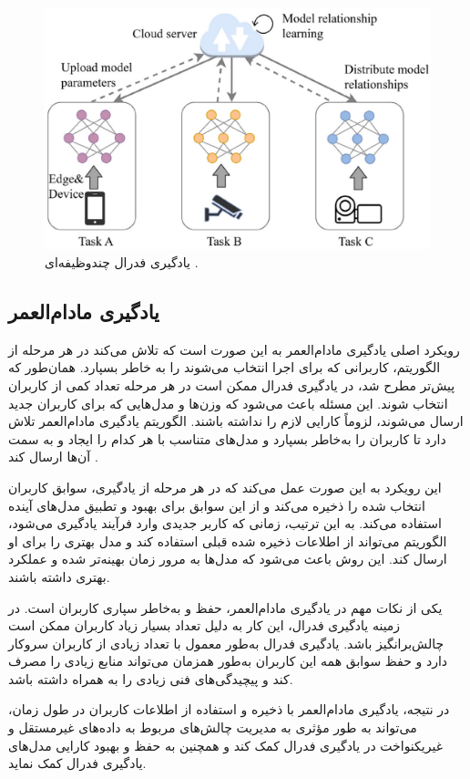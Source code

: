 \begin{figure}[b!]
	\centering
	\includegraphics[scale=0.9]{images/chap3/multi_tasking.png}%
	\caption{%
		یادگیری فدرال چندوظیفه‌ای
		\cite{ma2022state}%
		.
	}
	\label{multi_tasking}
	\centering
\end{figure}


\subsection{
	یادگیری مادام‌العمر%
}
رویکرد اصلی یادگیری مادام‌العمر به این صورت است که تلاش می‌کند در هر مرحله از الگوریتم، کاربرانی که برای اجرا انتخاب می‌شوند را به خاطر بسپارد. همان‌طور که پیش‌تر مطرح شد، در یادگیری فدرال ممکن است در هر مرحله تعداد کمی از کاربران انتخاب شوند. این مسئله باعث می‌شود که وزن‌ها و مدل‌هایی که برای کاربران جدید ارسال می‌شوند، لزوماً کارایی لازم را نداشته باشند. الگوریتم یادگیری مادام‌العمر تلاش دارد تا کاربران را به‌خاطر بسپارد و مدل‌های متناسب با هر کدام را ایجاد و به سمت آن‌ها ارسال کند
\cite{shoham2019overcoming}.

این رویکرد به این صورت عمل می‌کند که در هر مرحله از یادگیری، سوابق کاربران انتخاب شده را ذخیره می‌کند و از این سوابق برای بهبود و تطبیق مدل‌های آینده استفاده می‌کند. به این ترتیب، زمانی که کاربر جدیدی وارد فرآیند یادگیری می‌شود، الگوریتم می‌تواند از اطلاعات ذخیره شده قبلی استفاده کند و مدل بهتری را برای او ارسال کند. این روش باعث می‌شود که مدل‌ها به مرور زمان بهینه‌تر شده و عملکرد بهتری داشته باشند.

یکی از نکات مهم در یادگیری مادام‌العمر، حفظ و به‌خاطر سپاری کاربران است. در زمینه یادگیری فدرال، این کار به دلیل تعداد بسیار زیاد کاربران ممکن است چالش‌برانگیز باشد. یادگیری فدرال به‌طور معمول با تعداد زیادی از کاربران سروکار دارد و حفظ سوابق همه این کاربران به‌طور همزمان می‌تواند منابع زیادی را مصرف کند و پیچیدگی‌های فنی زیادی را به همراه داشته باشد.

در نتیجه، یادگیری مادام‌العمر با ذخیره و استفاده از اطلاعات کاربران در طول زمان، می‌تواند به طور مؤثری به مدیریت چالش‌های مربوط به داده‌های غیرمستقل و غیریکنواخت در یادگیری فدرال کمک کند و همچنین به حفظ و بهبود کارایی مدل‌های یادگیری فدرال کمک نماید.




